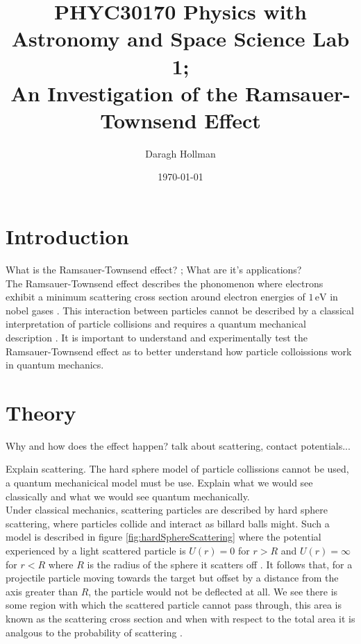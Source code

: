 \documentclass[%
reprint,
amsmath,amssymb,
aps,
floatfix
]{revtex4-2}
\begin{document}
	
	
	\title{PHYC30170 Physics with Astronomy and Space Science Lab 1;\\An Investigation of the Ramsauer-Townsend Effect}
	
	\author{Daragh Hollman}
	
	\date{\today}
	\maketitle
	
	\section{Introduction}
	What is the Ramsauer-Townsend effect? ; What are it's applications?\\
	
	The Ramsauer-Townsend effect describes the phonomenon where electrons exhibit a minimum scattering cross section around electron energies of $1\,\text{eV}$ in nobel gases \cite{wisconsin}. This interaction between particles cannot be described by a classical interpretation of particle collisions and requires a quantum mechanical description \cite{texas}. It is important to understand and experimentally test the Ramsauer-Townsend effect as to better understand how particle colloissions work in quantum mechanics.
	
	\section{Theory}
	Why and how does the effect happen? talk about scattering, contact potentials...
	
	Explain scattering. The hard sphere model of particle collissions cannot be used, a quantum mechanicical model must be use. Explain what we would see classically and what we would see quantum mechanically.\\
	
	Under classical mechanics, scattering particles are described by hard sphere scattering, where particles collide and interact as billard balls might. Such a model is described in figure \ref{fig:hardSphereScattering} where the potential experienced by a light scattered particle is $U(r) = 0$ for $r > R$ and $U(r) = \infty$ for $r < R$ where $R$ is the radius of the sphere it scatters off \cite{santaBarbara}. It follows that, for a projectile particle moving towards the target but offset by a distance from the axis greater than $R$, the particle would not be deflected at all. We see there is some region with which the scattered particle cannot pass through, this area is known as the scattering cross section and when with respect to the total area it is analgous to the probability of scattering \cite{santaBarbara}.\\
	
\end{document}
